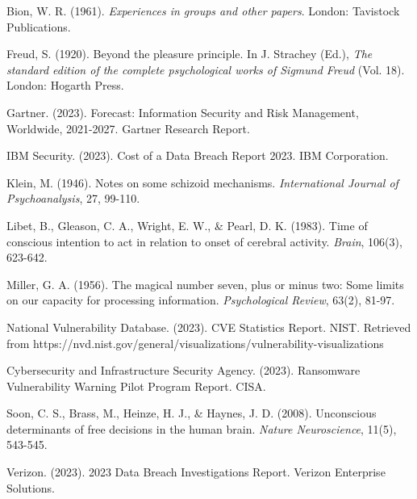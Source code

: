 \documentclass[11pt,a4paper]{article}
\begin{document}
\begin{thebibliography}{99}

Bion, W. R. (1961). \textit{Experiences in groups and other papers}. London: Tavistock Publications.

Freud, S. (1920). Beyond the pleasure principle. In J. Strachey (Ed.), \textit{The standard edition of the complete psychological works of Sigmund Freud} (Vol. 18). London: Hogarth Press.

Gartner. (2023). Forecast: Information Security and Risk Management, Worldwide, 2021-2027. Gartner Research Report.

IBM Security. (2023). Cost of a Data Breach Report 2023. IBM Corporation.

Klein, M. (1946). Notes on some schizoid mechanisms. \textit{International Journal of Psychoanalysis}, 27, 99-110.

Libet, B., Gleason, C. A., Wright, E. W., \& Pearl, D. K. (1983). Time of conscious intention to act in relation to onset of cerebral activity. \textit{Brain}, 106(3), 623-642.

Miller, G. A. (1956). The magical number seven, plus or minus two: Some limits on our capacity for processing information. \textit{Psychological Review}, 63(2), 81-97.

National Vulnerability Database. (2023). CVE Statistics Report. NIST. Retrieved from https://nvd.nist.gov/general/visualizations/vulnerability-visualizations

Cybersecurity and Infrastructure Security Agency. (2023). Ransomware Vulnerability Warning Pilot Program Report. CISA.

Soon, C. S., Brass, M., Heinze, H. J., \& Haynes, J. D. (2008). Unconscious determinants of free decisions in the human brain. \textit{Nature Neuroscience}, 11(5), 543-545.

Verizon. (2023). 2023 Data Breach Investigations Report. Verizon Enterprise Solutions.

\end{thebibliography}
\end{document}
